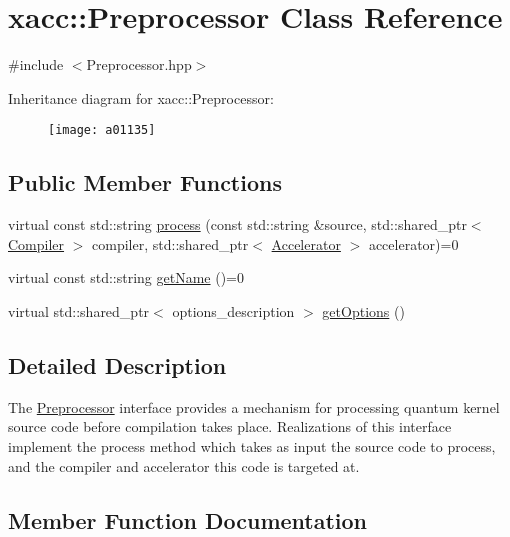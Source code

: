 \hypertarget{a01135}{}\section{xacc\+:\+:Preprocessor Class Reference}
\label{a01135}


{\ttfamily \#include $<$Preprocessor.\+hpp$>$}

Inheritance diagram for xacc\+:\+:Preprocessor\+:\begin{figure}[H]
\begin{center}
\leavevmode
\texttt{[image: a01135]}
\end{center}
\end{figure}
\subsection*{Public Member Functions}
\begin{DoxyCompactItemize}
\item 
virtual const std\+::string \hyperlink{a01135_ae59b5a2963f8bcc84b590a83f4749e19}{process} (const std\+::string \&source, std\+::shared\+\_\+ptr$<$ \hyperlink{a01127}{Compiler} $>$ compiler, std\+::shared\+\_\+ptr$<$ \hyperlink{a01111}{Accelerator} $>$ accelerator)=0
\item 
virtual const std\+::string \hyperlink{a01135_a36671f4c062d61e230306edc404774cd}{get\+Name} ()=0
\item 
virtual std\+::shared\+\_\+ptr$<$ options\+\_\+description $>$ \hyperlink{a01135_a96f5600ea47628b66917c7b90250e7f1}{get\+Options} ()
\end{DoxyCompactItemize}


\subsection{Detailed Description}
The \hyperlink{a01135}{Preprocessor} interface provides a mechanism for processing quantum kernel source code before compilation takes place. Realizations of this interface implement the process method which takes as input the source code to process, and the compiler and accelerator this code is targeted at. 

\subsection{Member Function Documentation}
\mbox{\label{a01135_a36671f4c062d61e230306edc404774cd}} 

